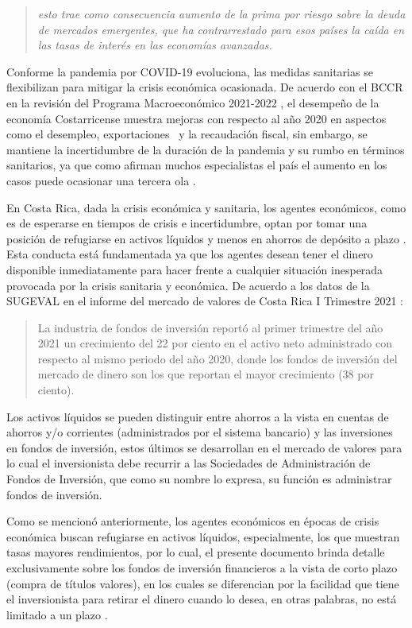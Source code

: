 \documentclass[
]{article}
\begin{document}
\begin{quote}
\emph{esto trae como consecuencia aumento de la prima por riesgo sobre la deuda de mercados emergentes, que ha contrarrestado para esos países la caída en las tasas de interés en las economías avanzadas.}
\end{quote}

Conforme la pandemia por COVID-19 evoluciona, las medidas sanitarias se flexibilizan para mitigar la crisis económica ocasionada. De acuerdo con el BCCR en la revisión del Programa Macroeconómico 2021-2022 \autocite{bccr2}, el desempeño de la economía Costarricense muestra mejoras con respecto al año 2020 en aspectos como el desempleo, exportaciones~ y la recaudación fiscal, sin embargo, se mantiene la incertidumbre de la duración de la pandemia y su rumbo en términos sanitarios, ya que como afirman muchos especialistas el país el aumento en los casos puede ocasionar una tercera ola \autocite{ccp3}.

En Costa Rica, dada la crisis económica y sanitaria, los agentes económicos, como es de esperarse en tiempos de crisis e incertidumbre, optan por tomar una posición de refugiarse en activos líquidos y menos en ahorros de depósito a plazo \autocite{bccr2} . Esta conducta está fundamentada ya que los agentes desean tener el dinero disponible inmediatamente para hacer frente a cualquier situación inesperada provocada por la crisis sanitaria y económica. De acuerdo a los datos de la SUGEVAL en el informe del mercado de valores de Costa Rica I Trimestre 2021 \autocite{sugeval5} :

\begin{quote}
La industria de fondos de inversión reportó al primer trimestre del año 2021 un crecimiento del 22 por ciento en el activo neto administrado con respecto al mismo periodo del año 2020, donde los fondos de inversión del mercado de dinero son los que reportan el mayor crecimiento (38 por ciento).
\end{quote}

Los activos líquidos se pueden distinguir entre ahorros a la vista en cuentas de ahorros y/o corrientes (administrados por el sistema bancario) y las inversiones en fondos de inversión, estos últimos se desarrollan en el mercado de valores para lo cual el inversionista debe recurrir a las Sociedades de Administración de Fondos de Inversión, que como su nombre lo expresa, su función es administrar fondos de inversión.

Como se mencionó anteriormente, los agentes económicos en épocas de crisis económica buscan refugiarse en activos líquidos, especialmente, los que muestran tasas mayores rendimientos, por lo cual, el presente documento brinda detalle exclusivamente sobre los fondos de inversión financieros a la vista de corto plazo (compra de títulos valores), en los cuales se diferencian por la facilidad que tiene el inversionista para retirar el dinero cuando lo desea, en otras palabras, no está limitado a un plazo \autocite{bncr4} .
\end{document}
